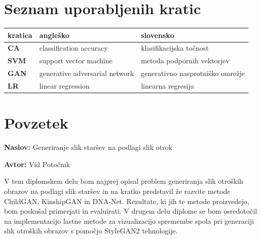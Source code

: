\documentclass[a4paper,12pt,openright]{book}
\newcommand{\ttitle}{Generiranje slik staršev na podlagi slik otrok}
\newcommand{\tauthor}{Vid Potočnik}
\newcommand{\clearemptydoublepage}{\newpage{\pagestyle{empty}\cleardoublepage}}
\begin{document}


\pagestyle{empty}
\def\thepage{}%
\tableofcontents{}


\clearemptydoublepage


\chapter*{Seznam uporabljenih kratic}

\noindent\begin{tabular}{p{}|p{}|p{}}    %
  {\bf kratica} & {\bf angleško} & {\bf slovensko} \\ \hline
  {\bf CA}      & classification accuracy & klasifikacijska točnost \\
  {\bf SVM}   & support vector machine & metoda podpornih vektorjev \\
  {\bf GAN}   & generative adversarial network & generativno nasprotniško omrežje \\
  {\bf LR}   & linear regression & linearna regresija  \\
\end{tabular}


\clearemptydoublepage

\chapter*{Povzetek}

\noindent\textbf{Naslov:} \ttitle
\bigskip

\noindent\textbf{Avtor:} \tauthor
\bigskip



\noindent V tem diplomskem delu bom najprej opisal problem generiranja slik otroških obrazov na podlagi slik staršev in na kratko predstavil že razvite metode ChildGAN, KinshipGAN in DNA-Net. Rezultate, ki jih te metode proizvedejo, bom poskušal primerjati in evaluirati. 
V drugem delu diplome se bom osredotočil na implementacijo lastne metode za vizualizacijo spremembe spola pri generaciji slik otroških obrazov s pomočjo StyleGAN2 tehnologije.
\end{document}
